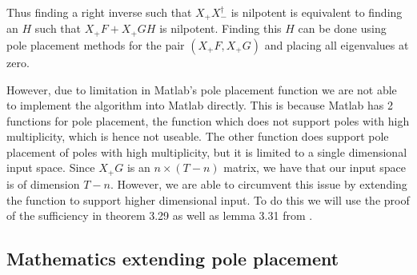 

Thus finding a right inverse such that $X_+ X_-^\dagger$ is nilpotent is equivalent to finding an $H$ such that $X_+ F + X_+ G H$ is nilpotent. Finding this $H$ can be done using pole placement methods for the pair $(X_+ F, X_+ G)$ and placing all eigenvalues at zero.



However, due to limitation in Matlab's pole placement function we are not able to implement the algorithm into Matlab directly. This is because Matlab has 2 functions for pole placement, the  function which does not support poles with high multiplicity, which is hence not useable. The other function  does support pole placement of poles with high multiplicity, but it is limited to a single dimensional input space. Since $X_+ G$ is an $n \times (T-n)$ matrix, we have that our input space is of dimension $T-n$. However, we are able to circumvent this issue by extending the  function to support higher dimensional input. To do this we will use the proof of the sufficiency in theorem 3.29 as well as lemma 3.31 from \cite{bookTrentelman}.

\subsection{Mathematics extending pole placement}

